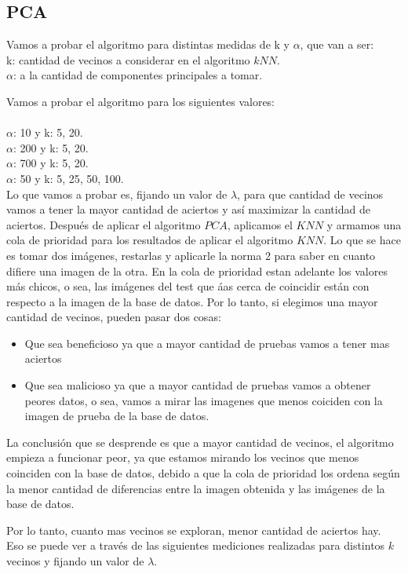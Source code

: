 \subsection{PCA}
Vamos a probar el algoritmo para distintas medidas de k y $\alpha$, que van a ser:\\
k: cantidad de vecinos a considerar en el algoritmo $kNN$.\\
$\alpha$: a la cantidad de componentes principales a tomar.

Vamos a probar el algoritmo para los siguientes valores:\\ \\
$\alpha$: 10  y k: 5, 20.\\
$\alpha$: 200 y k: 5, 20.\\
$\alpha$: 700 y k: 5, 20.\\
$\alpha$: 50  y k: 5, 25, 50, 100.\\

Lo que vamos a probar es, fijando un valor de $\lambda$, para que cantidad de vecinos vamos a tener la mayor cantidad de aciertos y así maximizar la cantidad de aciertos.
Después de aplicar el algoritmo $PCA$, aplicamos el $KNN$ y armamos una cola de prioridad para los resultados de aplicar el algoritmo $KNN$. Lo que se hace es tomar dos imágenes, restarlas y aplicarle la norma 2 para saber en cuanto difiere una imagen de la otra. En la cola de prioridad estan adelante los valores más chicos, o sea, las imágenes del test que áas cerca de coincidir están con respecto a la imagen de la base de datos.
Por lo tanto, si elegimos una mayor cantidad de vecinos, pueden pasar dos cosas:

\begin{itemize}
  \item Que sea beneficioso ya que a mayor cantidad de pruebas vamos a tener mas aciertos
  \item Que sea malicioso ya que a mayor cantidad de pruebas vamos a obtener peores datos, o sea, vamos a mirar las imagenes que menos coiciden con la imagen de prueba de la base de datos.
\end{itemize}

La conclusión que se desprende es que a mayor cantidad de vecinos, el algoritmo empieza a funcionar peor, ya que estamos mirando los vecinos que menos coinciden con la base de datos, debido a que la cola de prioridad los ordena según la menor cantidad de diferencias entre la imagen obtenida y las imágenes de la base de datos. 

Por lo tanto, cuanto mas vecinos se exploran, menor cantidad de aciertos hay. Eso se puede ver a través de las siguientes mediciones realizadas para distintos $k$ vecinos y fijando un valor de $\lambda$.

